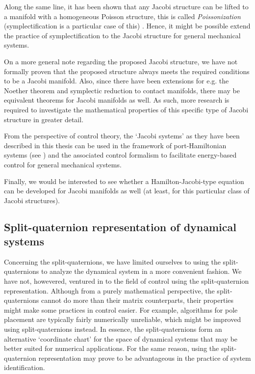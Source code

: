 Along the same line, it has been shown that any Jacobi structure can be lifted to a manifold with a homogeneous Poisson structure, this is called \emph{Poissonization} (symplectification is a particular case of this) \cite{marle1991}. Hence, it might be possible extend the practice of symplectification to the Jacobi structure for general mechanical systems. 

On a more general note regarding the proposed Jacobi structure, we have not formally proven that the proposed structure always meets the required conditions to be a Jacobi manifold. Also, since there have been extensions for e.g. the Noether theorem and symplectic reduction to contact manifolds, there may be equivalent theorems for Jacobi manifolds as well. As such, more research is required to investigate the mathematical properties of this specific type of Jacobi structure in greater detail.

From the perspective of control theory, the `Jacobi systems' as they have been described in this thesis can be used in the framework of port-Hamiltonian systems (see \citet{VanDerSchaft2006}) and the associated control formalism to facilitate energy-based control for general mechanical systems.

Finally, we would be interested to see whether a Hamilton-Jacobi-type equation can be developed for Jacobi manifolds as well (at least, for this particular class of Jacobi structures).

\subsection*{Split-quaternion representation of dynamical systems}
Concerning the split-quaternions, we have limited ourselves to using the split-quaternions to analyze the dynamical system in a more convenient fashion. We have not, howevered, ventured in to the field of control using the split-quaternion representation. Although from a purely mathematical perspective, the split-quaternions cannot do more than their matrix counterparts, their properties might make some practices in control easier. For example, algorithms for pole placement are typically fairly numerically unreliable, which might be improved using split-quaternions instead. In essence, the split-quaternions form an alternative `coordinate chart' for the space of dynamical systems that may be better suited for numerical applications. For the same reason, using the split-quaternion representation may prove to be advantageous in the practice of system identification.

